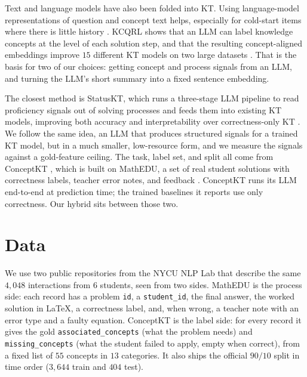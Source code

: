 \documentclass[11pt]{article}
\newcommand{\code}[1]{\texttt{\small #1}}
\begin{document}
Text and language models have also been folded into KT. Using language-model
representations of question and concept text helps, especially for cold-start items
where there is little history \cite{lee2024lkt}. KCQRL shows that an LLM can label
knowledge concepts at the level of each solution step, and that the resulting
concept-aligned embeddings improve $15$ different KT models on two large datasets
\cite{ozyurt2024kcqrl}. That is the basis for two of our choices: getting concept and
process signals from an LLM, and turning the LLM's short summary into a fixed sentence
embedding.

The closest method is StatusKT, which runs a three-stage LLM pipeline to read
proficiency signals out of solving processes and feeds them into existing KT models,
improving both accuracy and interpretability over correctness-only KT
\cite{park2025statuskt}. We follow the same idea, an LLM that produces structured
signals for a trained KT model, but in a much smaller, low-resource form, and we
measure the signals against a gold-feature ceiling. The task, label set, and split all
come from ConceptKT \cite{kang2026conceptkt}, which is built on MathEDU, a set of real
student solutions with correctness labels, teacher error notes, and feedback
\cite{hsu2026mathedu}. ConceptKT runs its LLM end-to-end at prediction time; the
trained baselines it reports use only correctness. Our hybrid sits between those two.

\section{Data}
We use two public repositories from the NYCU NLP Lab that describe the same $4{,}048$
interactions from $6$ students, seen from two sides. MathEDU \cite{hsu2026mathedu} is
the process side: each record has a problem \code{id}, a \code{student\_id}, the final
answer, the worked solution in \LaTeX, a correctness label, and, when wrong, a teacher
note with an error type and a faulty equation. ConceptKT \cite{kang2026conceptkt} is
the label side: for every record it gives the gold \code{associated\_concepts} (what
the problem needs) and \code{missing\_concepts} (what the student failed to apply,
empty when correct), from a fixed list of $55$ concepts in $13$ categories. It also
ships the official $90/10$ split in time order ($3{,}644$ train and $404$ test).
\end{document}

